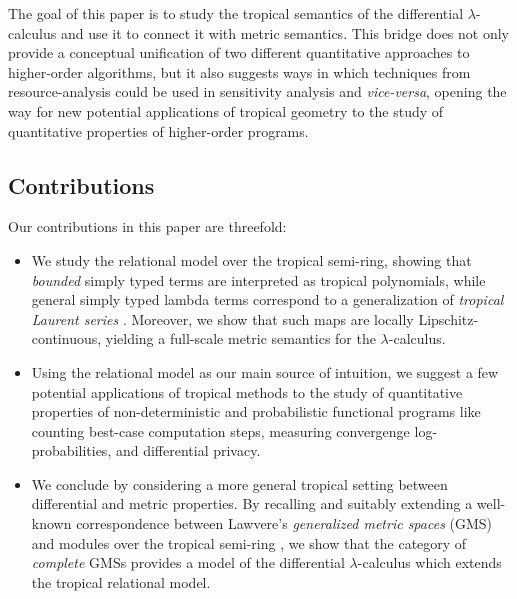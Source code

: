 The goal of this paper is to study the tropical semantics of the differential $\lambda$-calculus and use it to connect it with metric semantics. This bridge does not only provide a conceptual unification of two different quantitative approaches to higher-order algorithms, but it also 
suggests ways in which techniques from resource-analysis could be used in sensitivity analysis and \emph{vice-versa}, opening the way for new potential applications of tropical geometry to the study of quantitative properties of higher-order programs.


\subsection{Contributions}

Our contributions in this paper are threefold:
\begin{itemize}

\item We study the relational model over the tropical semi-ring, showing that
\emph{bounded} simply typed terms are interpreted as tropical polynomials, while general
 simply typed lambda terms correspond to a generalization of \emph{tropical Laurent series} \cite{Porzio2021}. Moreover, we show that such maps are locally Lipschitz-continuous, yielding a full-scale metric semantics for the $\lambda$-calculus.


\item Using the relational model as our main source of intuition, we suggest a few potential applications of tropical methods to the study of quantitative properties of non-deterministic and probabilistic functional programs like counting best-case computation steps, 
measuring convergenge log-probabilities, and 
differential privacy.

\item We conclude by considering a more general tropical setting between differential and metric properties.
By recalling and suitably extending a well-known correspondence between Lawvere's \emph{generalized metric spaces} (GMS) \cite{Lawvere1973, Stubbe2014} and modules over the tropical semi-ring \cite{Russo2007}, we show that the category of \emph{complete}  GMSs provides a model of the differential $\lambda$-calculus which extends the tropical relational model.
\end{itemize}
